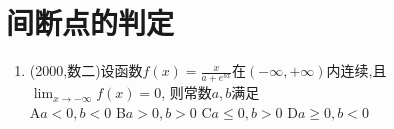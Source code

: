 \documentclass[12pt, a4paper, oneside, UTF8]{ctexbook}
\begin{document}
\section{间断点的判定}

\begin{enumerate}[label=\arabic*.,start=19]
    \item  (2000,数二)设函数$f(x)=\frac{x}{a+e^{bx}}$在$(-\infty,+\infty)$内连续,且$\lim_{x\to-\infty}f(x)=0$,
    则常数$a,b$满足 \\
        A\quad $a<0,b<0$ \qquad B\quad $a>0,b>0$ \qquad
        C\quad $a\leq0,b>0$ \qquad D\quad $a\geq0,b<0$
    
    \begin{solution}
    \newpage
    \end{solution}
\end{enumerate}



\ifx\allfiles\undefined
\end{document}
